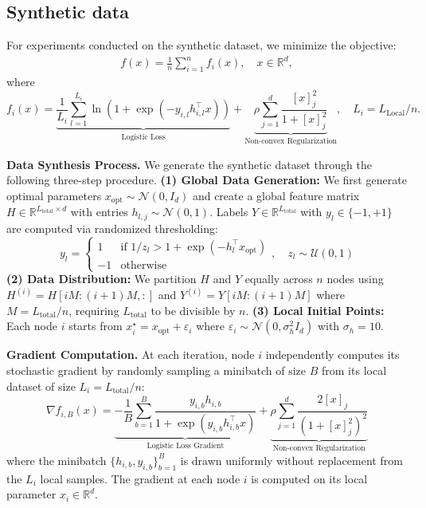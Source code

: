 \documentclass[10pt]{article}
\begin{document}
\subsection{Synthetic data}\label{app:subsec:synthetic}
For experiments conducted on the synthetic dataset, we minimize the objective:
\begin{align}
    f(x)=\frac{1}{n}\sum_{i=1}^n f_i(x),\quad x\in \mathbb{R}^{d}, \label{eq::obj_func}
\end{align}
where
\begin{equation*}
    f_{i}(x)= \underbrace{\frac{1}{L_i}\sum_{l=1}^{L_i} \ln\left(1+\exp(-y_{i,l}h_{i,l}^\top x)\right)}_{\text{Logistic Loss}} +\underbrace{\rho\sum_{j=1}^d\frac{[x]_j^2}{1+[x]_j^2}}_{\text{Non-convex Regularization}},\quad L_i=L_{\text{Local}}/n. 
\end{equation*}

\textbf{Data Synthesis Process.} We generate the synthetic dataset through the following three-step procedure. \textbf{(1) Global Data Generation:} We first generate optimal parameters $x_{\text{opt}} \sim \mathcal{N}(0,I_d)$ and create a global feature matrix $H \in \mathbb{R}^{L_{\text{total}}\times d}$ with entries $h_{l,j} \sim \mathcal{N}(0,1)$. Labels $Y\in \mathbb{R}^{L_{\text{total}}}$ with $y_l \in \{-1,+1\}$ are computed via randomized thresholding:
\begin{equation}
    y_l = \begin{cases}
        1 & \text{if } 1/z_l > 1 + \exp(-h_l^\top x_{\text{opt}}) \\
        -1 & \text{otherwise}
    \end{cases},\quad z_l \sim \mathcal{U}(0,1)\nonumber
\end{equation}
\textbf{(2) Data Distribution:} We partition $H$ and $Y$ equally across $n$ nodes using $H^{(i)} = H[iM:(i+1)M,:]$ and $Y^{(i)} = Y[iM:(i+1)M]$ where $M = L_{\text{total}}/n$, requiring $L_{\text{total}}$ to be divisible by $n$. \textbf{(3) Local Initial Points:} Each node $i$ starts from $x_i^\star = x_{\text{opt}} + \varepsilon_i$ where $\varepsilon_i \sim \mathcal{N}(0,\sigma_h^2I_d)$ with $\sigma_h=10$.

\textbf{Gradient Computation.} At each iteration, node $i$ independently computes its stochastic gradient by randomly sampling a minibatch of size $B$ from its local dataset of size $L_i = L_{\text{total}}/n$:
\begin{equation}
    \nabla f_{i,B}(x) = \underbrace{-\frac{1}{B}\sum_{b=1}^B \frac{y_{i,b}h_{i,b}}{1+\exp(y_{i,b}h_{i,b}^\top x)}}_{\text{Logistic Loss Gradient}} + \underbrace{\rho\sum_{j=1}^d \frac{2[x]_j}{(1+[x]_j^2)^2}}_{\text{Non-convex Regularization}}\nonumber
\end{equation}
where the minibatch $\{h_{i,b}, y_{i,b}\}_{b=1}^B$ is drawn uniformly without replacement from the $L_i$ local samples. The gradient at each node $i$ is computed on its local parameter $x_i \in \mathbb{R}^{d}$.
\end{document}
